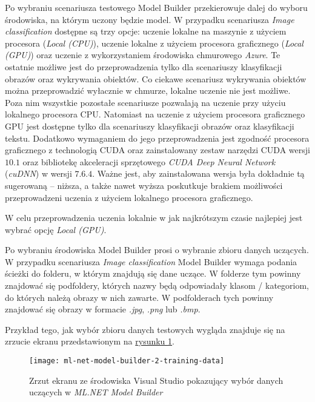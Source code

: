 Po wybraniu scenariusza testowego Model Builder przekierowuje dalej do wyboru środowiska, na którym uczony będzie model.
W przypadku scenariusza \emph{Image classification} dostępne są trzy opcje: uczenie lokalne na maszynie z użyciem procesora (\emph{Local (CPU)}), uczenie lokalne z użyciem procesora graficznego (\emph{Local (GPU)}) oraz uczenie z wykorzystaniem środowiska chmurowego \emph{Azure}.
Te ostatnie możliwe jest do przeprowadzenia tylko dla scenariuszy klasyfikacji obrazów oraz wykrywania obiektów.
Co ciekawe scenariusz wykrywania obiektów można przeprowadzić wyłacznie w chmurze, lokalne uczenie nie jest możliwe.
Poza nim wszystkie pozostałe scenariusze pozwalają na uczenie przy użyciu lokalnego procesora CPU.
Natomiast na uczenie z użyciem procesora graficznego GPU jest dostępne tylko dla scenariuszy klasyfikacji obrazów oraz klasyfikacji tekstu.
Dodatkowo wymaganiem do jego przeprowadzenia jest zgodność procesora graficznego z technologią CUDA oraz zainstalowany zestaw narzędzi CUDA wersji $10.1$ oraz bibliotekę akceleracji sprzętowego \emph{CUDA Deep Neural Network} (\emph{cuDNN}) w wersji $7.6.4$.
Ważne jest, aby zainstalowana wersja była dokładnie tą sugerowaną -- niższa, a także nawet wyższa poskutkuje brakiem możliwości przeprowadzeni uczenia z użyciem lokalnego procesora graficznego.

W celu przeprowadzenia uczenia lokalnie w jak najkrótszym czasie najlepiej jest wybrać opcję \emph{Local (GPU)}.

Po wybraniu środowiska Model Builder prosi o wybranie zbioru danych uczących.
W przypadku scenariusza \emph{Image classification} Model Builder wymaga podania ścieżki do folderu, w którym znajdują się dane uczące.
W folderze tym powinny znajdować się podfoldery, których nazwy będą odpowiadały klasom / kategoriom, do których należą obrazy w nich zawarte.
W podfolderach tych powinny znajdować się obrazy w formacie \emph{.jpg}, \emph{.png} lub \emph{.bmp}.

Przykład tego, jak wybór zbioru danych testowych wygląda znajduje się na zrzucie ekranu przedstawionym na \hyperref[fig:ml-net-model-builder-2-training-data]{rysunku \ref*{fig:ml-net-model-builder-2-training-data}}.

\begin{figure}[ht]
  \texttt{[image: ml-net-model-builder-2-training-data]}
  \caption{Zrzut ekranu ze środowiska Visual Studio pokazujący wybór danych uczących w \emph{ML.NET Model Builder}}
  \label{fig:ml-net-model-builder-2-training-data}
\end{figure}

